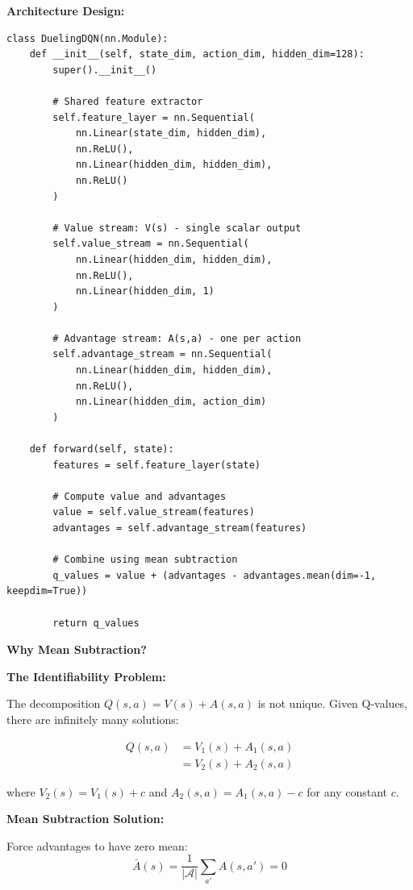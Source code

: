 \documentclass[12pt]{article}
\begin{document}
{{\textbf{Architecture Design:}

\begin{verbatim}
class DuelingDQN(nn.Module):
    def __init__(self, state_dim, action_dim, hidden_dim=128):
        super().__init__()
        
        # Shared feature extractor
        self.feature_layer = nn.Sequential(
            nn.Linear(state_dim, hidden_dim),
            nn.ReLU(),
            nn.Linear(hidden_dim, hidden_dim),
            nn.ReLU()
        )
        
        # Value stream: V(s) - single scalar output
        self.value_stream = nn.Sequential(
            nn.Linear(hidden_dim, hidden_dim),
            nn.ReLU(),
            nn.Linear(hidden_dim, 1)
        )
        
        # Advantage stream: A(s,a) - one per action
        self.advantage_stream = nn.Sequential(
            nn.Linear(hidden_dim, hidden_dim),
            nn.ReLU(),
            nn.Linear(hidden_dim, action_dim)
        )
    
    def forward(self, state):
        features = self.feature_layer(state)
        
        # Compute value and advantages
        value = self.value_stream(features)
        advantages = self.advantage_stream(features)
        
        # Combine using mean subtraction
        q_values = value + (advantages - advantages.mean(dim=-1, keepdim=True))
        
        return q_values
\end{verbatim}

\textbf{Why Mean Subtraction?}

\textbf{The Identifiability Problem:}

The decomposition $Q(s,a) = V(s) + A(s,a)$ is not unique. Given Q-values, there are infinitely many solutions:

\begin{align}
Q(s,a) &= V_1(s) + A_1(s,a) \\
&= V_2(s) + A_2(s,a)
\end{align}

where $V_2(s) = V_1(s) + c$ and $A_2(s,a) = A_1(s,a) - c$ for any constant $c$.

\textbf{Mean Subtraction Solution:}

Force advantages to have zero mean:
\begin{equation}
\bar{A}(s) = \frac{1}{|\mathcal{A}|}\sum_{a'} A(s,a') = 0
\end{equation}

}}
\end{document}
